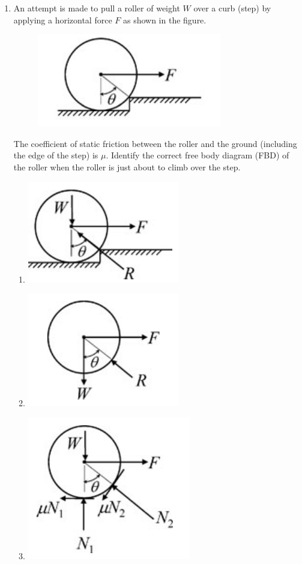 \documentclass[12pt,onecolumn]{article}
\begin{document}
\begin{enumerate}
    \item An attempt is made to pull a roller of weight $W$ over a curb (step) by applying a horizontal force $F$ as shown in the figure.
          \begin{figure}[H]
              \centering
              \includegraphics[scale=0.4]{q5s2mech}
              \label{fig:q5s2mech}
          \end{figure}
          The coefficient of static friction between the roller and the ground (including the edge of the step) is $\mu$. Identify the correct free body diagram (FBD) of the roller when the roller is just about to climb over the step.
          \begin{enumerate}
              \item \includegraphics[scale=0.4]{o5a}
              \item \includegraphics[scale=0.4]{o5b}
              \item \includegraphics[scale=0.4]{o5c}

\end{enumerate}
\end{enumerate}
\end{document}
